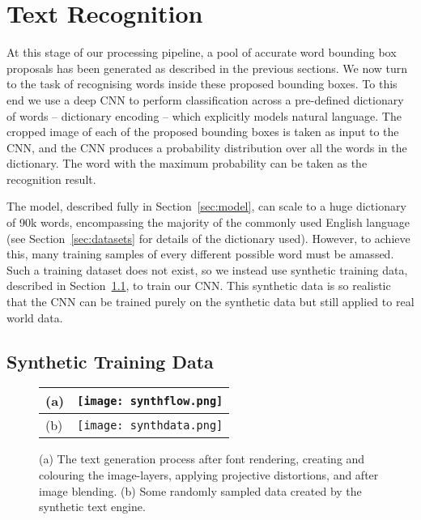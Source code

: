 \documentclass[twocolumn]{svjour3}          \smartqed  \usepackage{epsfig}
\begin{document}
 


\section{Text Recognition}
\label{sec:recognition}

At this stage of our processing pipeline, a pool of accurate word bounding box proposals has been generated as described in the previous sections. We now turn to the task of recognising words inside these proposed bounding boxes. To this end we use a deep CNN to perform classification across a pre-defined dictionary of words -- dictionary encoding -- which explicitly models natural language. The cropped image of each of the proposed bounding boxes is taken as input to the CNN, and the CNN produces a probability distribution over all the words in the dictionary. The word with the maximum probability can be taken as the recognition result. 

The model, described fully in Section~\ref{sec:model}, can scale to a huge dictionary of 90k words, encompassing the majority of the commonly used English language (see Section~\ref{sec:datasets} for details of the dictionary used). However, to achieve this, many training samples of every different possible word must be amassed. Such a training dataset does not exist, so we instead use synthetic training data, described in Section~\ref{sec:synthdata}, to train our CNN. This synthetic data is so realistic that the CNN can be trained purely on the synthetic data but still applied to real world data.

\subsection{Synthetic Training Data}
\label{sec:synthdata}

\begin{figure*}
\centering
\begin{tabular}{>{\centering}m{10pt}m{}}
(a) & \texttt{[image: synthflow.png]}\\
\hline
(b) & \texttt{[image: synthdata.png]}\\
\end{tabular}
\vspace*{-3mm}
\caption{(a) The text generation process after font rendering, creating and colouring the image-layers, applying projective distortions, and after image blending. (b) Some randomly sampled data created by the synthetic text engine.}
\label{fig:synthdata}
\end{figure*}
\end{document}
